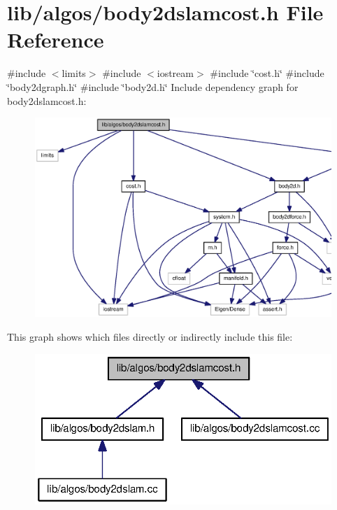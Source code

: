 \section{lib/algos/body2dslamcost.h \-File \-Reference}
\label{body2dslamcost_8h}
{\ttfamily \#include $<$limits$>$}\*
{\ttfamily \#include $<$iostream$>$}\*
{\ttfamily \#include \char`\"{}cost.\-h\char`\"{}}\*
{\ttfamily \#include \char`\"{}body2dgraph.\-h\char`\"{}}\*
{\ttfamily \#include \char`\"{}body2d.\-h\char`\"{}}\*
\-Include dependency graph for body2dslamcost.\-h\-:\nopagebreak
\begin{figure}[H]
\begin{center}
\leavevmode
\includegraphics[width=350pt]{body2dslamcost_8h__incl}
\end{center}
\end{figure}
\-This graph shows which files directly or indirectly include this file\-:\nopagebreak
\begin{figure}[H]
\begin{center}
\leavevmode
\includegraphics[width=321pt]{body2dslamcost_8h__dep__incl}
\end{center}
\end{figure}

